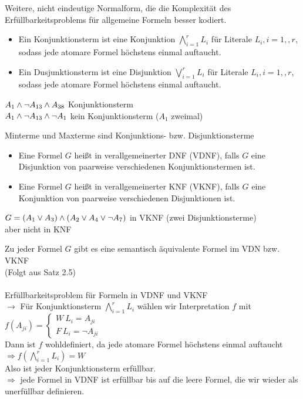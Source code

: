 

Weitere, nicht eindeutige Normalform, die die Komplexität des Erfüllbarkeitsproblems für allgemeine Formeln besser kodiert. 

\begin{itemize}
\item Ein Konjunktionsterm ist eine Konjunktion $\bigwedge_{i = 1}^r L_i$ für Literale $L_i, i=1, , r$, sodass jede atomare Formel höchstens einmal auftaucht.
\item Ein Dusjunktionsterm ist eine Disjunktion $\bigvee_{i=1}^r L_i$ für Literale $L_i, i=1, , r$, sodass jede atomare Formel höchstens einmal auftaucht.
\end{itemize}

\beispiel{}
$A_1 \wedge \neg A_{13} \wedge A_{38}$ Konjunktionsterm\\
$A_1 \wedge \neg A_{13} \wedge \neg A_1$ kein Konjunktionsterm ($A_1$ zweimal)

\bemerkung{}
Minterme und Maxterme sind Konjunktions- bzw. Disjunktionsterme

\begin{itemize}
\item Eine Formel $G$ heißt in verallgemeinerter DNF (VDNF), falls $G$ eine Disjunktion von paarweise verschiedenen Konjunktionstermen ist.
\item Eine Formel $G$ heißt in verallgemeinerter KNF (VKNF), falls $G$ eine Konjunktion von paarweise verschiedenen Disjunktionen ist.
\end{itemize}

\beispiel{}
$G = (A_1 \vee A_3) \wedge (A_2 \vee A_4 \vee \neg A_7)$ in VKNF (zwei Disjunktionsterme)\\
aber nicht in KNF

\bemerkung{}
Zu jeder Formel $G$ gibt es eine semantisch äquivalente Formel im VDN bzw. VKNF\\
(Folgt aus Satz 2.5)\\

\noindent\\
Erfüllbarkeitsproblem für Formeln in VDNF und VKNF\\
$\rightarrow$ Für Konjunktionsterm $\bigwedge_{i=1}^r L_i$ wählen wir Interpretation $f$ mit $f(A_{ji}) = \begin{cases} W\ L_i = A_{ji} \\ F\ L_i = \neg A_{ji} \end{cases}$\\
Dann ist $f$ wohldefiniert, da jede atomare Formel höchstens einmal auftaucht \\
$\Rightarrow f(\bigwedge_{i=1}^r L_i) = W$\\
Also ist jeder Konjunktionsterm erfüllbar.\\
$\Rightarrow$ jede Formel in VDNF ist erfüllbar bis auf die leere Formel, die wir wieder als unerfüllbar definieren.\\

